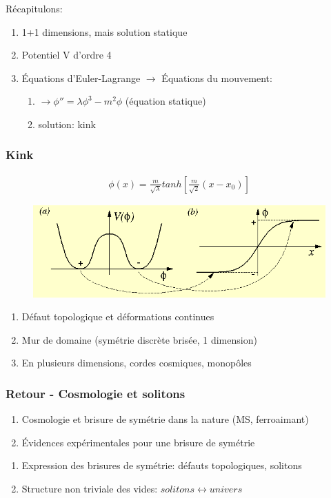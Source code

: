 \documentclass[handout]{beamer}
\begin{document}
\begin{frame}
Récapitulons:
\begin{enumerate}
\item 1+1 dimensions, mais solution statique
\item Potentiel V d'ordre 4 
\item Équations d'Euler-Lagrange $\rightarrow$ Équations du mouvement: 
\begin{enumerate}
\item $\rightarrow \phi'' = \lambda \phi^3 - m^2 \phi$ (équation statique)
\item solution: kink
\end{enumerate}
\end{enumerate}
\end{frame}

\begin{frame}\frametitle{Kink}
\begin{align*}
\phi(x) = \frac{m}{\sqrt{\lambda}}tanh\left[\frac{m}{\sqrt{2}}(x-x_0)\right]
\end{align*}
\begin{figure}
\includegraphics[scale=0.4]{soli_def.png}
\end{figure}


\begin{enumerate}
\item Défaut topologique et déformations continues
\item Mur de domaine (symétrie discrète brisée, 1 dimension)
\item En plusieurs dimensions, cordes cosmiques, monopôles
\end{enumerate}
\end{frame}

\begin{frame}\frametitle{Retour - Cosmologie et solitons}
\begin{enumerate}
\item Cosmologie et brisure de symétrie dans la nature (MS, ferroaimant)
\item Évidences expérimentales pour une brisure de symétrie
\end{enumerate}
\begin{enumerate}
\item Expression des brisures de symétrie: défauts topologiques, solitons
\item Structure non triviale des vides: $solitons \leftrightarrow univers$
\end{enumerate}



\end{frame}
\end{document}
